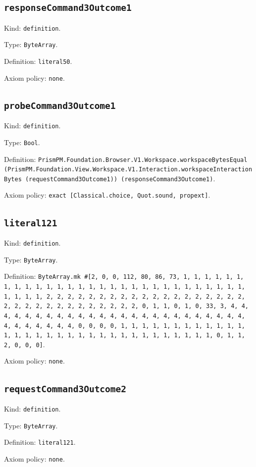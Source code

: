 \documentclass[11pt]{article}
\begin{document}
\subsection*{\texttt{responseCommand3Outcome1}}
\noindent Kind: \texttt{definition}.\par
\noindent Type: \texttt{ByteArray}.\par
\noindent Definition: \texttt{literal50}.\par
\noindent Axiom policy: \texttt{none}.\par
\subsection*{\texttt{probeCommand3Outcome1}}
\noindent Kind: \texttt{definition}.\par
\noindent Type: \texttt{Bool}.\par
\noindent Definition: \texttt{PrismPM.Foundation.Browser.V1.Workspace.workspaceBytesEqual (PrismPM.Foundation.View.Workspace.V1.Interaction.workspaceInteractionBytes (requestCommand3Outcome1)) (responseCommand3Outcome1)}.\par
\noindent Axiom policy: \texttt{exact [Classical.choice, Quot.sound, propext]}.\par
\subsection*{\texttt{literal121}}
\noindent Kind: \texttt{definition}.\par
\noindent Type: \texttt{ByteArray}.\par
\noindent Definition: \texttt{ByteArray.mk \#[2, 0, 0, 112, 80, 86, 73, 1, 1, 1, 1, 1, 1, 1, 1, 1, 1, 1, 1, 1, 1, 1, 1, 1, 1, 1, 1, 1, 1, 1, 1, 1, 1, 1, 1, 1, 1, 1, 1, 1, 2, 2, 2, 2, 2, 2, 2, 2, 2, 2, 2, 2, 2, 2, 2, 2, 2, 2, 2, 2, 2, 2, 2, 2, 2, 2, 2, 2, 2, 2, 2, 2, 0, 1, 1, 0, 1, 0, 33, 3, 4, 4, 4, 4, 4, 4, 4, 4, 4, 4, 4, 4, 4, 4, 4, 4, 4, 4, 4, 4, 4, 4, 4, 4, 4, 4, 4, 4, 4, 4, 4, 4, 0, 0, 0, 0, 1, 1, 1, 1, 1, 1, 1, 1, 1, 1, 1, 1, 1, 1, 1, 1, 1, 1, 1, 1, 1, 1, 1, 1, 1, 1, 1, 1, 1, 1, 1, 1, 0, 1, 1, 2, 0, 0, 0]}.\par
\noindent Axiom policy: \texttt{none}.\par
\subsection*{\texttt{requestCommand3Outcome2}}
\noindent Kind: \texttt{definition}.\par
\noindent Type: \texttt{ByteArray}.\par
\noindent Definition: \texttt{literal121}.\par
\noindent Axiom policy: \texttt{none}.\par
\end{document}
